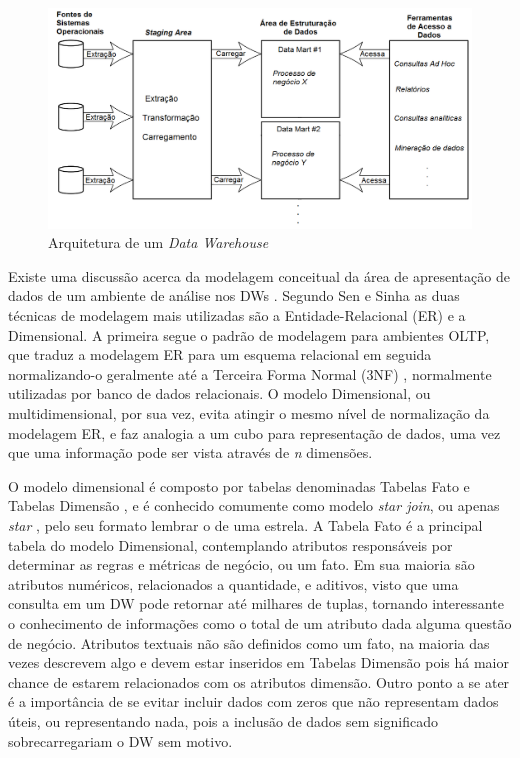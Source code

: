 \begin{figure}[htpb]
	\centering
		\includegraphics[width=\textwidth]{img/dw_arc}
    \caption{Arquitetura de um \textit{Data Warehouse}}
	\label{fig:dw_arq}
\end{figure}

Existe uma discussão acerca da modelagem conceitual da área de apresentação de dados de um ambiente de análise nos DWs \cite{sen2005comparison}. Segundo Sen e Sinha \cite{sen2005comparison} as duas técnicas de modelagem mais utilizadas são a Entidade-Relacional (ER) e a Dimensional. A primeira segue o padrão de modelagem para ambientes OLTP, que traduz a modelagem ER para um esquema relacional em seguida normalizando-o geralmente até a Terceira Forma Normal (3NF) \cite{kimball2002dw}, normalmente utilizadas por banco de dados relacionais. O modelo Dimensional, ou multidimensional, por sua vez, evita atingir o mesmo nível de normalização da modelagem ER, e faz analogia a um cubo para representação de dados, uma vez que uma informação pode ser vista através de \textit{n} dimensões. 

O modelo dimensional é composto por tabelas denominadas Tabelas Fato e Tabelas Dimensão \cite{kimball2002dw}, e é conhecido comumente como modelo \textit{star join}, ou apenas \textit{star} \cite{sen2005comparison}, pelo seu formato lembrar o de uma estrela. A Tabela Fato é a principal tabela do modelo Dimensional, contemplando atributos responsáveis por determinar as regras e métricas de negócio, ou um fato. Em sua maioria são atributos numéricos, relacionados a quantidade, e aditivos, visto que uma consulta em um DW pode retornar até milhares de tuplas, tornando interessante o conhecimento de informações como o total de um atributo dada alguma questão de negócio. Atributos textuais não são definidos como um fato, na maioria das vezes descrevem algo e devem estar inseridos em Tabelas Dimensão pois há maior chance de estarem relacionados com os atributos dimensão. Outro ponto a se ater é a importância de se evitar incluir dados com zeros que não representam dados úteis, ou representando nada, pois a inclusão de dados sem significado sobrecarregariam o DW sem motivo.


